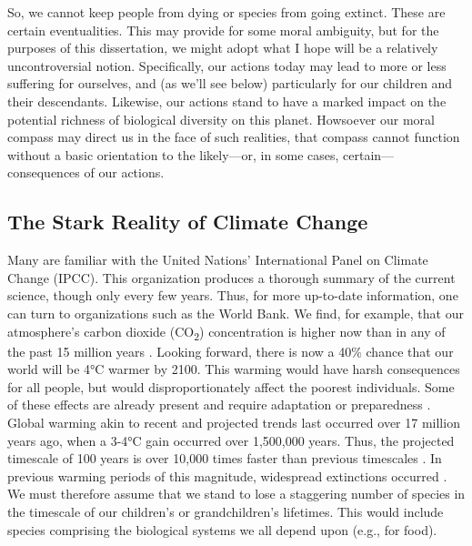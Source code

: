 So, we cannot keep people from dying or species from going extinct. These are
certain eventualities. This may provide for some moral ambiguity, but for the
purposes of this dissertation, we might adopt what I hope will be a relatively
uncontroversial notion. Specifically, our actions today may lead to more or
less suffering for ourselves, and (as we'll see below) particularly for our
children and their descendants. Likewise, our actions stand to have a marked
impact on the potential richness of biological diversity on this planet.
Howsoever our moral compass may direct us in the face of such realities,
that compass cannot function without a basic orientation to the likely---or, in
some cases, certain---consequences of our actions.

\subsection{The Stark Reality of Climate Change}


Many are familiar with the United Nations' International Panel on Climate Change
(IPCC). This organization produces a thorough summary of the current science,
though only every few years. Thus, for more up-to-date information, one can turn
to organizations such as the World Bank. We find, for example, that our
atmosphere's carbon dioxide (CO\textsubscript{2}) concentration is higher now
than in any of the past 15 million years \parencite{world_bank_turn_2012}.
Looking forward, there is now a 40\% chance that our world will be 4°C warmer by
2100. This warming would have harsh consequences for all people, but would
disproportionately affect the poorest individuals.  Some of these effects are
already present and require adaptation or preparedness
\parencite{potsdam_institute_for_climate_impact_research_and_climate_analytics_turn_2013}.
Global warming akin to recent and projected trends last occurred over 17 million
years ago, when a 3-4°C gain occurred over 1,500,000 years. Thus, the projected
timescale of 100 years is over 10,000 times faster than previous timescales
\parencite{barnosky_heatstroke:_2009}. In previous warming periods of this
magnitude, widespread extinctions occurred \parencite{mayhew_long-term_2008}. We
must therefore assume that we stand to lose a staggering number of species in
the timescale of our children's or grandchildren's lifetimes. This would include
species comprising the biological systems we all depend upon (e.g., for food).

